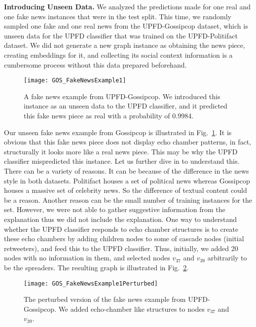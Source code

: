 \textbf{Introducing Unseen Data.} We analyzed the predictions made for one real and one fake news instances that were in the test split. This time, we randomly sampled one fake and one real news from the UPFD-Gossipcop dataset, which is unseen data for the UPFD classifier that was trained on the UPFD-Politifact dataset. We did not generate a new graph instance as obtaining the news piece, creating embeddings for it, and collecting its social context information is a cumbersome process without this data prepared beforehand.\\
\begin{figure}
    \centering
    \texttt{[image: GOS\_FakeNewsExample1]}
    \caption[A fake news example from UPFD-Gossipcop.]{A fake news example from UPFD-Gossipcop. We introduced this instance as an unseen data to the UPFD classifier, and it predicted this fake news piece as real with a probability of 0.9984.}
    \label{fig:GOS_FakeNewsExample1}
\end{figure}
Our unseen fake news example from Gossipcop is illustrated in Fig.~\ref{fig:GOS_FakeNewsExample1}. It is obvious that this fake news piece does not display echo chamber patterns, in fact, structurally it looks more like a real news piece. This may be why the UPFD classifier mispredicted this instance. Let us further dive in to understand this. There can be a variety of reasons. It can be because of the difference in the news style in both datasets. Politifact houses a set of political news whereas Gossipcop houses a massive set of celebrity news. So the difference of textual content could be a reason. Another reason can be the small number of training instances for the set. However, we were not able to gather suggestive information from the explanation thus we did not include the explanation. One way to understand whether the UPFD classifier responds to echo chamber structures is to create these echo chambers by adding children nodes to some of cascade nodes (initial retweeters), and feed this to the UPFD classifier. Thus, initially, we added 20 nodes with no information in them, and selected nodes $v_{37}$ and $v_{39}$ arbitrarily to be the spreaders. The resulting graph is illustrated in Fig.~\ref{fig:GOS_FakeNewsExample1Perturbed}.
\begin{figure}
    \centering
    \texttt{[image: GOS\_FakeNewsExample1Perturbed]}
    \caption[The perturbed version of the fake news example from UPFD-Gossipcop]{The perturbed version of the fake news example from UPFD-Gossipcop. We added echo-chamber like structures to nodes $v_{37}$ and $v_{39}$.}
    \label{fig:GOS_FakeNewsExample1Perturbed}
\end{figure}
